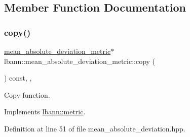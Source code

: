 \subsection{Member Function Documentation}
\mbox{\label{classlbann_1_1mean__absolute__deviation__metric_ad49148043214908a671799bcdd0b120b}} 
\subsubsection{\texorpdfstring{copy()}{copy()}}
{\footnotesize\ttfamily \hyperlink{classlbann_1_1mean__absolute__deviation__metric}{mean\+\_\+absolute\+\_\+deviation\+\_\+metric}$\ast$ lbann\+::mean\+\_\+absolute\+\_\+deviation\+\_\+metric\+::copy (\begin{DoxyParamCaption}{ }\end{DoxyParamCaption}) const\hspace{0.3cm}{\ttfamily [inline]}, {\ttfamily [override]}, {\ttfamily [virtual]}}

Copy function. 

Implements \hyperlink{classlbann_1_1metric_a2a4498d41f77da8585552f485caab167}{lbann\+::metric}.



Definition at line 51 of file mean\+\_\+absolute\+\_\+deviation.\+hpp.


